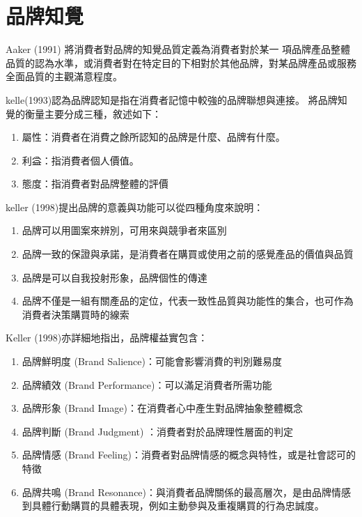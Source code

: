 \section{品牌知覺}
Aaker (1991) 將消費者對品牌的知覺品質定義為消費者對於某一 項品牌產品整體品質的認為水準，或消費者對在特定目的下相對於其他品牌，對某品牌產品或服務全面品質的主觀滿意程度。\cite{Aaker1991}

kelle(1993)認為品牌認知是指在消費者記憶中較強的品牌聯想與連接。
將品牌知覺的衡量主要分成三種\cite{Keller1993}，敘述如下：
\begin{enumerate}
\item 屬性：消費者在消費之餘所認知的品牌是什麼、品牌有什麼。
\item 利益：指消費者個人價值。
\item 態度：指消費者對品牌整體的評價
\end{enumerate}


keller (1998)提出品牌的意義與功能可以從四種角度來說明\cite{Keller1998}：
\begin{enumerate}
\item 品牌可以用圖案來辨別，可用來與競爭者來區別

\item 品牌一致的保證與承諾，是消費者在購買或使用之前的感覺產品的價值與品質

\item 品牌是可以自我投射形象，品牌個性的傳達

\item 品牌不僅是一組有關產品的定位，代表一致性品質與功能性的集合，也可作為消費者決策購買時的線索
\end{enumerate}
    Keller (1998)亦詳細地指出，品牌權益實包含\cite{Keller1998}：
\begin{enumerate}
\item 品牌鮮明度 (Brand Salience)：可能會影響消費的判別難易度
\item 品牌績效 (Brand Performance)：可以滿足消費者所需功能
\item 品牌形象 (Brand Image)：在消費者心中產生對品牌抽象整體概念
\item 品牌判斷 (Brand Judgment) ：消費者對於品牌理性層面的判定
\item 品牌情感 (Brand Feeling)：消費者對品牌情感的概念與特性，或是社會認可的特徵
\item 品牌共鳴 (Brand Resonance)：與消費者品牌關係的最高層次，是由品牌情感到具體行動購買的具體表現，例如主動參與及重複購買的行為忠誠度。
\end{enumerate}
  
